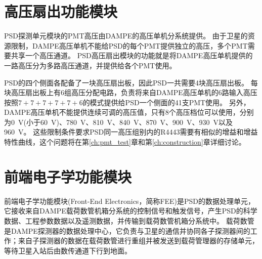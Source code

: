 
\section{高压扇出功能模块}
\label{sec:description:psd_hv}
PSD探测单元模块的PMT高压由DAMPE的高压单机分系统提供。
由于卫星的资源限制，DAMPE高压单机不能给PSD的每个PMT提供独立的高压，多个PMT需要共享一个高压通道。
PSD高压扇出模块的功能就是将DAMPE高压单机提供的一路高压分为多路高压通道，并提供给各个PMT使用。

PSD的四个侧面各配备了一块高压扇出板，因此PSD一共需要4块高压扇出板。
每块高压扇出板上有6组高压分配电路，负责将来自DAMPE高压单机的6路输入高压按照$7+7+7+7+7+6$的模式提供给PSD一个侧面的41支PMT使用。
另外，DAMPE高压单机不能提供连续可调的高压值，只有8个高压档位可以使用，分别为\SI{0}{V}(小于\SI{60}{V})、\SI{780}{V}、\SI{810}{V}、\SI{840}{V}、\SI{870}{V}、\SI{900}{V}、\SI{930}{V}以及\SI{960}{\volt}。
这些限制条件要求PSD同一高压组别内的R4443需要有相似的增益和增益特性曲线，这个问题将在第\ref{ch:pmt_test}章和第\ref{ch:construction}章详细讨论。

\section{前端电子学功能模块}
\label{sec:description:psd_electronics}
前端电子学功能模块(Front-End Electronics，简称FEE)是PSD的数据处理单元，它接收来自DAMPE载荷数管机箱分系统的控制信号和触发信号，产生PSD的科学数据、工程参数数据以及遥测数据，并传输到载荷数管机箱分系统中。
载荷数管是DAMPE探测器的数据处理中心，它负责与卫星的通信并协同各子探测器间的工作；来自子探测器的数据在载荷数管进行重组并被发送到载荷管理器的存储单元，等待卫星入站后由数传通道下行到地面。

